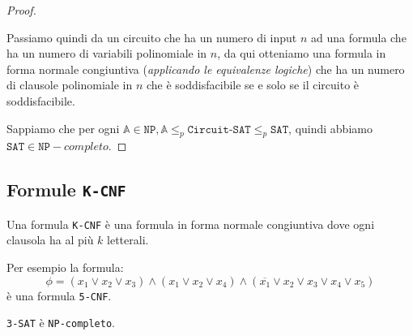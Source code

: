 \begin{proof}
\begin{enumerate}
            Passiamo quindi da un circuito che ha un numero di input $n$ ad una 
            formula che ha un numero di variabili polinomiale in $n$, da qui 
            otteniamo una formula in forma normale congiuntiva (\textit{applicando 
            le equivalenze logiche}) che ha un numero di clausole polinomiale in $n$ 
            che è soddisfacibile se e solo se il circuito è soddisfacibile.
    \end{enumerate}
    Sappiamo che per ogni $\mathbb{A} \in \texttt{NP}, \mathbb{A}
    \leq_p \texttt{Circuit-SAT} \leq_p \texttt{SAT}$, quindi abbiamo 
    $\texttt{SAT} \in \texttt{NP}-completo$.
\end{proof}
\subsection{Formule \texttt{K-CNF}}
Una formula \texttt{K-CNF} è una formula in forma normale congiuntiva 
dove ogni clausola ha al più $k$ letterali.

Per esempio la formula:
\[
    \phi = (x_1 \lor x_2 \lor x_3) \land (x_1 \lor x_2 \lor x_4) \land
    (\overline{x_1} \lor x_2 \lor x_3 \lor x_4 \lor x_5)
\]
è una formula \texttt{5-CNF}.

\begin{theorem}
    \texttt{3-SAT} è \texttt{NP-completo}.
\end{theorem}

